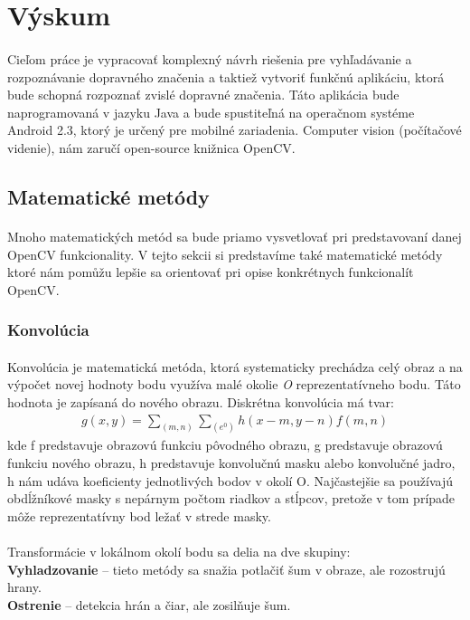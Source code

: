 \documentclass[12pt]{article}
\begin{document}
\section{Výskum}
\paragraph{}
Cieľom práce je vypracovať komplexný návrh riešenia pre vyhľadávanie a rozpoznávanie dopravného značenia a taktiež vytvoriť funkčnú aplikáciu, ktorá
bude schopná rozpoznať zvislé dopravné značenia. Táto aplikácia bude naprogramovaná v jazyku Java a bude spustiteľná na
 operačnom systéme Android 2.3, ktorý je určený pre mobilné zariadenia. Computer vision (počítačové videnie), nám zaručí open-source knižnica OpenCV.
\subsection{Matematické metódy}
\paragraph{}
Mnoho matematických metód sa bude priamo vysvetlovať pri predstavovaní danej OpenCV funkcionality.
V tejto sekcii si predstavíme také matematické metódy ktoré nám pomůžu lepšie sa orientovať pri opise konkrétnych funkcionalít OpenCV.
\subsubsection{Konvolúcia}
\paragraph{}
Konvolúcia je matematická metóda, ktorá systematicky prechádza celý obraz a na výpočet novej hodnoty bodu využíva malé okolie \emph{O} reprezentatívneho bodu. 
Táto hodnota je zapísaná do nového obrazu. Diskrétna konvolúcia má tvar:
\begin{align*}
g(x,y) = \sum_{(m,n)} \sum_{(e^0)} h(x - m,y - n)f(m,n)
\end{align*}
kde f predstavuje obrazovú funkciu pôvodného obrazu, g predstavuje obrazovú funkciu nového obrazu, h predstavuje konvolučnú masku alebo konvolučné jadro, h nám udáva koeficienty jednotlivých bodov v okolí O.
Najčastejšie sa používajú  obdĺžníkové masky s nepárnym počtom riadkov a stĺpcov, pretože v tom prípade môže reprezentatívny bod ležať v strede masky.
\paragraph{}
Transformácie v lokálnom okolí bodu sa delia na dve skupiny: \\
\textbf{Vyhladzovanie} – tieto metódy sa snažia potlačiť šum v obraze, ale rozostrujú hrany. \\
\textbf{Ostrenie} – detekcia hrán a čiar, ale zosilňuje šum. \\
\end{document}
